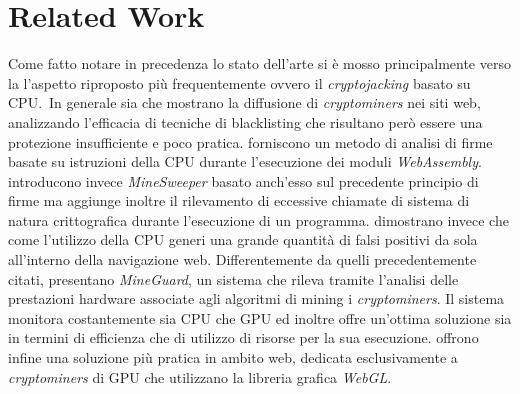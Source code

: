 \documentclass[
11pt, %
oneside, %
italian, %
onehalfspacing,%
headsepline, %
]{MastersDoctoralThesis} %
\newcommand\citen[1]{\citeauthor{#1} \citep{#1}}
\begin{document}
{\chapter{Related Work}}
Come fatto notare in precedenza lo stato dell'arte si è mosso principalmente verso la l'aspetto riproposto più frequentemente ovvero il \emph{cryptojacking} basato su CPU.\ In generale sia \citen{musch2018web} che \citen{saad2018end} mostrano la diffusione di \emph{cryptominers} nei siti web, analizzando l'efficacia di tecniche di blacklisting che risultano però essere una protezione insufficiente e poco pratica. \citen{wang2018seismic} forniscono un metodo di analisi di firme basate su istruzioni della CPU durante l'esecuzione dei moduli \emph{WebAssembly}. \citen{konoth2018minesweeper} introducono invece \emph{MineSweeper} basato anch'esso sul precedente principio di firme ma aggiunge inoltre il rilevamento di eccessive chiamate di sistema di natura crittografica durante l'esecuzione di un programma. \citen{kharraz2019outguard} dimostrano invece che come l'utilizzo della CPU generi una grande quantità di falsi positivi da sola all'interno della navigazione web. Differentemente da quelli precedentemente citati, \citen{tahir2017mining} presentano \emph{MineGuard}, un sistema che rileva tramite l'analisi delle prestazioni hardware associate agli algoritmi di mining i \emph{cryptominers}. Il sistema monitora costantemente sia CPU che GPU ed inoltre offre un'ottima soluzione sia in termini di efficienza che di utilizzo di risorse per la sua esecuzione. \citen{belkin2019risks} offrono infine una soluzione più pratica in ambito web, dedicata esclusivamente a \emph{cryptominers} di GPU che utilizzano la libreria grafica \emph{WebGL}.
\end{document}
